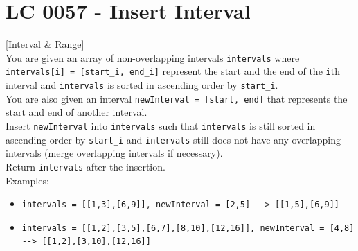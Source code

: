 \section{LC 0057 - Insert Interval}\label{lc0057}
\hyperref[sec:interval_range]{[Interval \& Range]}\\

You are given an array of non-overlapping intervals {\colorbox{CodeBackground}{\lstinline|intervals|}} where {\colorbox{CodeBackground}{\lstinline|intervals[i] = [start_i, end_i]|}} represent the start and the end of the {\colorbox{CodeBackground}{\lstinline|i|}}th interval and {\colorbox{CodeBackground}{\lstinline|intervals|}} is sorted in ascending order by {\colorbox{CodeBackground}{\lstinline|start_i|}}. \\

You are also given an interval {\colorbox{CodeBackground}{\lstinline|newInterval = [start, end]|}} that represents the start and end of another interval.\\

Insert {\colorbox{CodeBackground}{\lstinline|newInterval|}} into {\colorbox{CodeBackground}{\lstinline|intervals|}} such that {\colorbox{CodeBackground}{\lstinline|intervals|}} is still sorted in ascending order by {\colorbox{CodeBackground}{\lstinline|start_i|}} and {\colorbox{CodeBackground}{\lstinline|intervals|}} still does not have any overlapping intervals (merge overlapping intervals if necessary).\\

Return {\colorbox{CodeBackground}{\lstinline|intervals|}} after the insertion.\\

Examples:
\begin{itemize}
\item {\colorbox{CodeBackground}{\lstinline|intervals = [[1,3],[6,9]], newInterval = [2,5] --> [[1,5],[6,9]]|}}
\item {\colorbox{CodeBackground}{\lstinline|intervals = [[1,2],[3,5],[6,7],[8,10],[12,16]], newInterval = [4,8] --> [[1,2],[3,10],[12,16]]|}}
\end{itemize}

